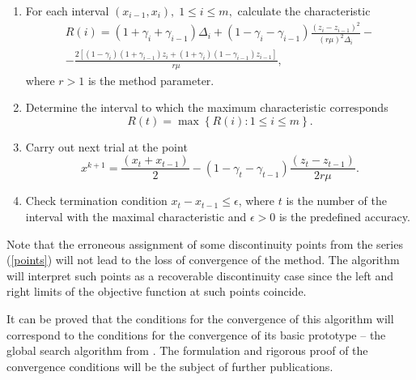 \documentclass[runningheads]{llncs}
\begin{document}
\begin{enumerate}
\item For each interval $(x_{i-1},x_i), \; 1\leq i \leq m,$ calculate the characteristic
\[
\begin{gathered}
R(i)=(1+\gamma_i+\gamma_{i-1} )\Delta_i+(1-\gamma_i-\gamma_{i-1} ) \frac{ (z_i-z_{i-1} )^2}{(r\mu)^2 \Delta_i }-\\
-\frac{2[(1-\gamma_i )(1+\gamma_{i-1} ) z_i+(1+\gamma_i )(1-\gamma_{i-1} ) z_{i-1} ]}{r\mu},
\end{gathered}
\]
where $r>1$ is the method parameter.

\item Determine the interval to which the maximum characteristic corresponds 
\[
R(t)=\max\left\{R(i): 1 \leq i \leq m\right\}.
\]

\item Carry out next trial at the point
\[
x^{k+1}=\frac {(x_t+x_{t-1})}{2}-(1-\gamma_t-\gamma_{t-1} ) \frac{(z_t-z_{t-1})}{2r\mu}.
\]

\item Check termination condition $x_t-x_{t-1} \leq \epsilon$, where $t$ is the number of the interval with the maximal characteristic and $\epsilon > 0$ is the predefined accuracy.

\end{enumerate}

Note that the erroneous assignment of some discontinuity points from the series (\ref{points}) will not lead to the loss of convergence of the method. The algorithm will interpret such points as a recoverable discontinuity case since the left and right limits of the objective function at such points coincide.

It can be proved that the conditions for the convergence of this algorithm will correspond to the conditions for the convergence of its basic prototype -- the global search algorithm from \cite{Strongin2000}. The formulation and rigorous proof of the convergence conditions will be the subject of further publications.
\end{document}
